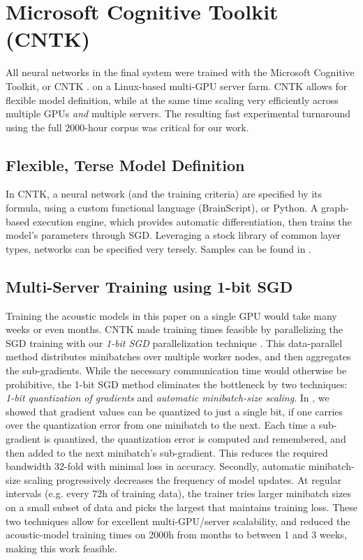\documentclass{article}
\begin{document}
\section{Microsoft Cognitive Toolkit (CNTK)}
\label{sec:cntk}
All neural networks in the final system were trained with the
Microsoft Cognitive Toolkit, or CNTK \cite{cntkai,CNTK}.
on a Linux-based multi-GPU server farm.
CNTK allows for flexible model definition, while at the same
time scaling very efficiently
across multiple GPUs {\em and} multiple servers.
The resulting fast experimental turnaround
using the full 2000-hour corpus was critical for our work.
\subsection{Flexible, Terse Model Definition}
In CNTK, a neural network (and the training criteria) are specified by
its formula, using a custom functional language (BrainScript), or Python.
A graph-based execution engine, which provides automatic differentiation, then trains the model's parameters through SGD.
Leveraging a stock library of common layer types, networks can be specified
very tersely.
Samples can be found in \cite{cntkai}.
\subsection{Multi-Server Training using 1-bit SGD}
Training the acoustic models in this paper on a single GPU would take many weeks or even months.
CNTK made training times feasible by parallelizing the SGD training with our {\em 1-bit SGD}
parallelization technique \cite{seide20141}. This data-parallel method distributes minibatches over multiple worker nodes, and then aggregates the sub-gradients.
While the necessary communication time would otherwise be prohibitive,
the 1-bit SGD method eliminates the bottleneck by two techniques: {\em 1-bit quantization of gradients} and {\em automatic minibatch-size scaling}.
In \cite{seide20141}, we showed that gradient values can be quantized to just a single bit, if one carries over the quantization error from one minibatch to the next. Each time a sub-gradient is quantized, the quantization error is computed and remembered, and then added to the next minibatch's sub-gradient. This reduces the required bandwidth 32-fold with minimal loss in accuracy.
Secondly, automatic minibatch-size scaling progressively decreases the frequency of model updates. At regular intervals (e.g. every 72h of training data), the trainer tries larger minibatch sizes on a small subset of data and picks the largest that maintains training loss.
These two techniques allow for excellent multi-GPU/server scalability,
and reduced the acoustic-model training times on 2000h from months to between 1 and 3 weeks,
making this work feasible.
\end{document}
